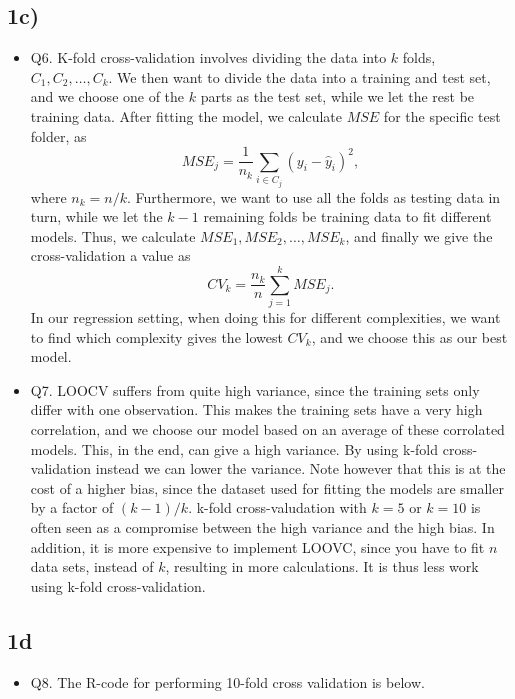 \documentclass[]{article}
\providecommand{\tightlist}{%
  \setlength{\itemsep}{0pt}\setlength{\parskip}{0pt}}
\begin{document}
\subsection{1c)}\label{c}

\begin{itemize}
\item
  Q6. K-fold cross-validation involves dividing the data into \(k\)
  folds, \(C_1, C_2, \dots, C_k\). We then want to divide the data into
  a training and test set, and we choose one of the \(k\) parts as the
  test set, while we let the rest be training data. After fitting the
  model, we calculate \(MSE\) for the specific test folder, as
  \[MSE_j=\frac{1}{n_k}\sum_{i \in C_j}(y_i-\hat y_i)^2,\] where
  \(n_k=n/k\). Furthermore, we want to use all the folds as testing data
  in turn, while we let the \(k-1\) remaining folds be training data to
  fit different models. Thus, we calculate
  \(MSE_1, MSE_2,\dots, MSE_k\), and finally we give the
  cross-validation a value as \[CV_k=\frac{n_k}{n}\sum_{j=1}^k MSE_j.\]
  In our regression setting, when doing this for different complexities,
  we want to find which complexity gives the lowest \(CV_k\), and we
  choose this as our best model.
\item
  Q7. LOOCV suffers from quite high variance, since the training sets
  only differ with one observation. This makes the training sets have a
  very high correlation, and we choose our model based on an average of
  these corrolated models. This, in the end, can give a high variance.
  By using k-fold cross-validation instead we can lower the variance.
  Note however that this is at the cost of a higher bias, since the
  dataset used for fitting the models are smaller by a factor of
  \((k-1)/k\). k-fold cross-valudation with \(k=5\) or \(k=10\) is often
  seen as a compromise between the high variance and the high bias. In
  addition, it is more expensive to implement LOOVC, since you have to
  fit \(n\) data sets, instead of \(k\), resulting in more calculations.
  It is thus less work using k-fold cross-validation.
\end{itemize}

\subsection{1d}\label{d}

\begin{itemize}
\tightlist
\item
  Q8. The R-code for performing 10-fold cross validation is below.
\end{itemize}
\end{document}
